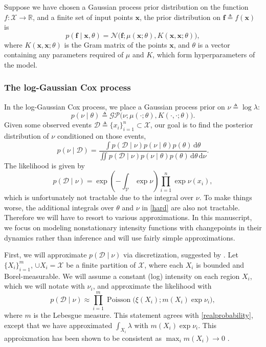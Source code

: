 \documentclass{article}
\newcommand{\deq}{\triangleq}
\newcommand{\cm}[1]{\mathcal{#1}}
\newcommand{\data}{\cm{D}}
\newcommand{\given}{\mid}
\newcommand{\R}{\mathbb{R}}
\newcommand{\intd}[1]{\,\mathrm{d}#1}
\DeclareMathOperator{\poisson}{Poisson}
\begin{document}
Suppose we have chosen a Gaussian process prior distribution on the
function $f\colon \cm{X} \to \R$, and a finite set of input points
$\bm{x}$, the prior distribution on $\bm{f} \deq f(\bm{x})$ is
\begin{equation*}
 p(\bm{f} \given \bm{x}, \theta)
 =
 \cm{N}
 \bigl(
   \bm{f};
   \mu(\bm{x}; \theta),
   K(\bm{x}, \bm{x}; \theta)
 \bigr),
\end{equation*}
where $K(\bm{x}, \bm{x}; \theta)$ is the Gram matrix of the points
$\bm{x}$, and $\theta$ is a vector containing any parameters required
of $\mu$ and $K$, which form hyperparameters of the model.

\subsubsection{The log-Gaussian Cox process}

In the log-Gaussian Cox process, we place a Gaussian process prior on
$\nu \deq \log \lambda$:
\begin{equation*}
  p(\nu \given \theta) 
  \deq 
  \cm{GP}\bigl(\nu; \mu(\cdot; \theta), K(\cdot, \cdot; \theta)\bigr).
\end{equation*}
Given some observed events $\data \deq \lbrace x_i \rbrace_{i=1}^n
\subset \cm{X}$, our goal is to find the posterior distribution of
$\nu$ conditioned on those events,
\begin{equation}
  \label{nuposterior}
  p(\nu \given \data)
  =
  \frac
  {
    \int p(\data \given \nu)
    p(\nu \given \theta)
    p(\theta) \intd{\theta}
  }
  {
    \iint p(\data \given \nu)
    p(\nu \given \theta) 
    p(\theta) 
    \intd{\theta} \intd{\nu}
  }.
\end{equation}
The likelihood is given by
\begin{equation}
  \label{hard}
  p(\data \given \nu) 
  =
  \exp\left( -\int_{\cm{V}} \exp \nu \right) \prod_{i = 1}^n \exp \nu(x_i),
\end{equation}
which is unfortunately not tractable due to the integral over $\nu$.
To make things worse, the additional integrals over $\theta$ and $\nu$
in \eqref{hard} are also not tractable.  Therefore we will have to
resort to various approximations.  In this manuscript, we focus on
modeling nonstationary intensity functions with changepoints in their
dynamics rather than inference and will use fairly simple
approximations.

First, we will approximate $p(\data \given \nu)$ via discretization,
suggested by \citet{moller}.  Let $\lbrace X_i \rbrace_{i=1}^m$, $\cup
X_i = \cm{X}$ be a finite partition of $\cm{X}$, where each $X_i$ is
bounded and Borel-measurable. We will assume a constant (log)
intensity on each region $X_i$, which we will notate with $\nu_i$, and
approximate the likelihood with
\begin{equation*}
  p(\data \given \nu) 
  \approx
  \prod_{i=1}^m
  \poisson\bigl(\xi(X_i); m(X_i) \exp \nu_i\bigr),
\end{equation*}
where $m$ is the Lebesgue measure.  This statement agrees with
\eqref{realprobability}, except that we have approximated $\int_{X_i}
\lambda$ with $m(X_i) \exp \nu_i$.  This approixmation has been shown
to be consistent as $\max_i m(X_i) \to 0$ \citep{ghosh}.
\end{document}
